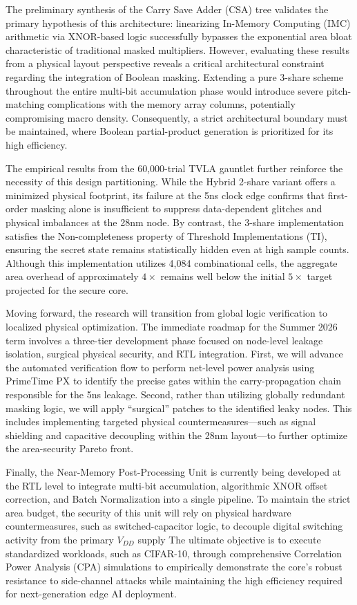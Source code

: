 \documentclass[journal]{IEEEtran}
\begin{document}
The preliminary synthesis of the Carry Save Adder (CSA) tree validates the primary hypothesis of this architecture: linearizing In-Memory Computing (IMC) arithmetic via XNOR-based logic successfully bypasses the exponential area bloat characteristic of traditional masked multipliers. However, evaluating these results from a physical layout perspective reveals a critical architectural constraint regarding the integration of Boolean masking. Extending a pure 3-share scheme throughout the entire multi-bit accumulation phase would introduce severe pitch-matching complications with the memory array columns, potentially compromising macro density. Consequently, a strict architectural boundary must be maintained, where Boolean partial-product generation is prioritized for its high efficiency.

The empirical results from the 60,000-trial TVLA gauntlet further reinforce the necessity of this design partitioning. While the Hybrid 2-share variant offers a minimized physical footprint, its failure at the 5ns clock edge confirms that first-order masking alone is insufficient to suppress data-dependent glitches and physical imbalances at the 28nm node. By contrast, the 3-share implementation satisfies the Non-completeness property of Threshold Implementations (TI), ensuring the secret state remains statistically hidden even at high sample counts. Although this implementation utilizes 4,084 combinational cells, the aggregate area overhead of approximately $4\times$ remains well below the initial $5\times$ target projected for the secure core.

Moving forward, the research will transition from global logic verification to localized physical optimization. The immediate roadmap for the Summer 2026 term involves a three-tier development phase focused on node-level leakage isolation, surgical physical security, and RTL integration. First, we will advance the automated verification flow to perform net-level power analysis using PrimeTime PX to identify the precise gates within the carry-propagation chain responsible for the 5ns leakage. Second, rather than utilizing globally redundant masking logic, we will apply ``surgical'' patches to the identified leaky nodes. This includes implementing targeted physical countermeasures—such as signal shielding and capacitive decoupling within the 28nm layout—to further optimize the area-security Pareto front. 

Finally, the Near-Memory Post-Processing Unit is currently being developed at the RTL level to integrate multi-bit accumulation, algorithmic XNOR offset correction, and Batch Normalization into a single pipeline. To maintain the strict area budget, the security of this unit will rely on physical hardware countermeasures, such as switched-capacitor logic, to decouple digital switching activity from the primary $V_{DD}$ supply The ultimate objective is to execute standardized workloads, such as CIFAR-10, through comprehensive Correlation Power Analysis (CPA) simulations to empirically demonstrate the core's robust resistance to side-channel attacks while maintaining the high efficiency required for next-generation edge AI deployment.
\end{document}
